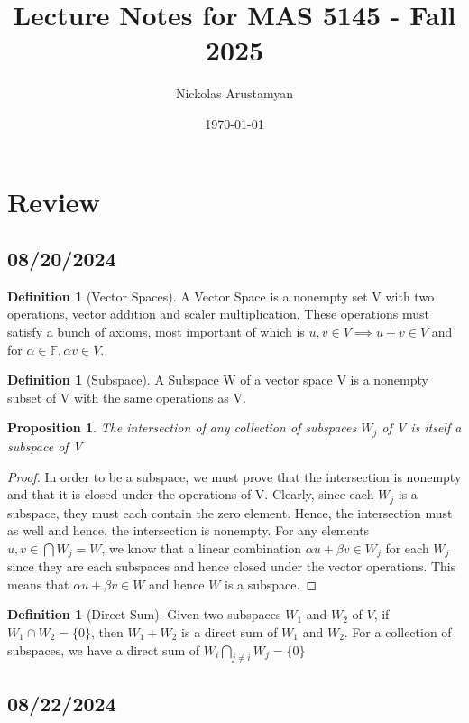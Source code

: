 \documentclass{tufte-handout}
\title{Lecture Notes for MAS 5145 - Fall 2025}
\author[Nickolas Arustamyan]{Nickolas Arustamyan}
\date{\today}  %
\newtheorem{prop}[thm]{Proposition}
\theoremstyle{definition}
\newtheorem{defn}[thm]{Definition}
\theoremstyle{remark}
\newcommand{\F}{\mathbb{F}}
\begin{document}
\maketitle
\tableofcontents
\section{Review}
\subsection{08/20/2024}
\begin{defn}[Vector Spaces]
A Vector Space is a nonempty set V with two operations, vector addition and scaler multiplication. These operations must satisfy a bunch of axioms, most important of which is $u,v \in V \implies u+v \in V$ and for $\alpha \in \F, \alpha v \in V$.
\end{defn}

\begin{defn}[Subspace]
A Subspace W of a vector space V is a nonempty subset of V with the same operations as V. 
\end{defn}
\begin{prop}The intersection of any collection of subspaces $W_j$ of V is itself a subspace of V \end{prop}
\begin{proof}
 In order to be a subspace, we must prove that the intersection is nonempty and that it is closed under the operations of V. Clearly, since each $W_j$ is a subspace, they must each contain the zero element. Hence, the intersection must as well and hence, the intersection is nonempty. For any elements $u, v \in \bigcap W_j = W$, we know that a linear combination $\alpha u + \beta v \in W_j$ for each $W_j$ since they are each subspaces and hence closed under the vector operations. This means that $\alpha u + \beta v \in W$ and hence $W$ is a subspace.
\end{proof}

\begin{defn}[Direct Sum]
Given two subspaces $W_1$ and $W_2$ of $V$, if $W_1\cap W_2 = \{0\}$, then $W_1+W_2$ is a direct sum of $W_1$ and $W_2$. For a collection of subspaces, we have a direct sum of $W_i \bigcap_{j \neq i} W_j = \{0\}$ 
\end{defn}

\subsection{08/22/2024}
\end{document}
